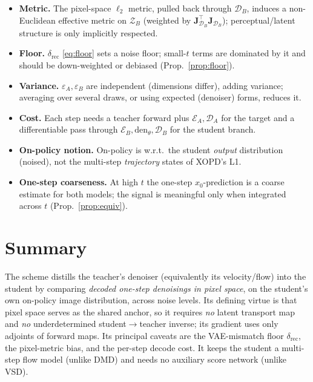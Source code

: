 \documentclass[11pt,a4paper]{article}
\newcommand{\Zb}{\mathcal{Z}_{B}}
\newcommand{\Enc}{\mathcal{E}}
\newcommand{\Dec}{\mathcal{D}}
\newcommand{\den}{\mathrm{den}}
\newcommand{\Jac}{\mathbf{J}}
\theoremstyle{definition}
\begin{document}
\begin{itemize}[leftmargin=1.4em,itemsep=2pt]
  \item \textbf{Metric.} The pixel-space $\ell_2$ metric, pulled back through $\Dec_B$, induces a
        non-Euclidean effective metric on $\Zb$ (weighted by $\Jac_{\Dec_B}^{\!\top}\Jac_{\Dec_B}$);
        perceptual/latent structure is only implicitly respected.
  \item \textbf{Floor.} $\delta_{\mathrm{rec}}$ \eqref{eq:floor} sets a noise floor; small-$t$ terms
        are dominated by it and should be down-weighted or debiased (Prop.~\ref{prop:floor}).
  \item \textbf{Variance.} $\varepsilon_A,\varepsilon_B$ are independent (dimensions differ), adding
        variance; averaging over several draws, or using expected (denoiser) forms, reduces it.
  \item \textbf{Cost.} Each step needs a teacher forward plus $\Enc_A,\Dec_A$ for the target and a
        differentiable pass through $\Enc_B,\den_\theta,\Dec_B$ for the student branch.
  \item \textbf{On-policy notion.} On-policy is w.r.t.\ the student \emph{output} distribution
        (noised), not the multi-step \emph{trajectory} states of XOPD's L1.
  \item \textbf{One-step coarseness.} At high $t$ the one-step $x_0$-prediction is a coarse
        estimate for both models; the signal is meaningful only when integrated across $t$
        (Prop.~\ref{prop:equiv}).
\end{itemize}

\section{Summary}
\label{sec:summary}

The scheme distills the teacher's denoiser (equivalently its velocity/flow) into the student by
comparing \emph{decoded one-step denoisings in pixel space}, on the student's own on-policy image
distribution, across noise levels. Its defining virtue is that pixel space serves as the shared
anchor, so it requires \emph{no} latent transport map and \emph{no} underdetermined
student$\to$teacher inverse; its gradient uses only adjoints of forward maps. Its principal
caveats are the VAE-mismatch floor $\delta_{\mathrm{rec}}$, the pixel-metric bias, and the per-step
decode cost. It keeps the student a multi-step flow model (unlike DMD) and needs no auxiliary
score network (unlike VSD).
\end{document}
